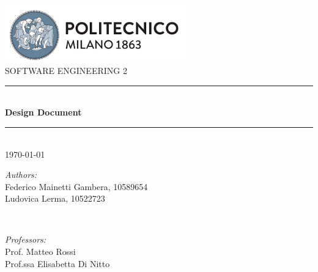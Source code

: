 


        \begin{titlepage}
                \center

                \includegraphics[width=0.6\textwidth]{Images/PolimiLogo.png}\\[1cm]

                \textsc{\Large SOFTWARE ENGINEERING 2}\\[0.2cm]

                \newcommand{\HRule}{\rule{\linewidth}{0.5mm}}
                \HRule \\[0.8cm]
                { \huge \bfseries Design Document}\\[0.7cm]
                \HRule \\ [0.4cm]

                {\large \today}\\[1.5cm]

                \begin{minipage}{0.59\textwidth}
                        \begin{flushleft} \large
                                \emph{Authors:}\\
                                Federico Mainetti Gambera, 10589654\\
                                Ludovica Lerma, 10522723\\
                        \end{flushleft}
                \end{minipage}
                        ~
                \begin{minipage}{0.39\textwidth}
                        \begin{flushright} \large
                                \emph{Professors:}\\
                                Prof. Matteo Rossi \\
                                Prof.ssa Elisabetta Di Nitto \\
                        \end{flushright}
                \end{minipage}\\[1cm]


\end{titlepage}
